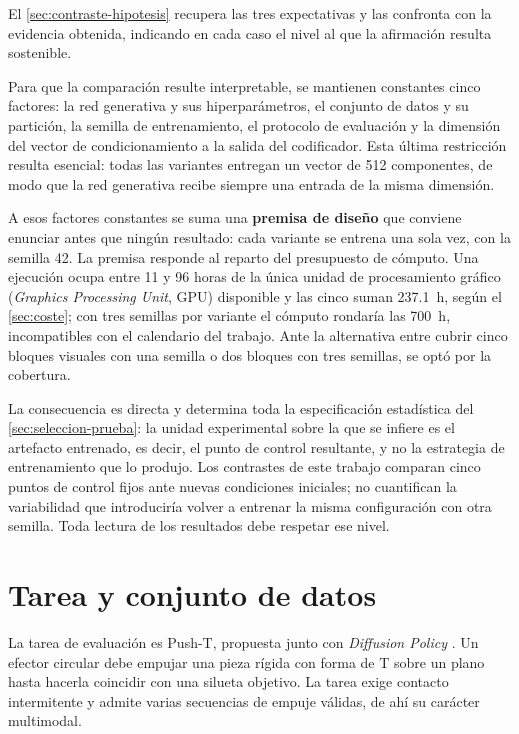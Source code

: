 El \cref{sec:contraste-hipotesis} recupera las tres expectativas y las confronta con la
evidencia obtenida, indicando en cada caso el nivel al que la afirmaci\'on resulta
sostenible.

Para que la comparaci\'on resulte interpretable, se mantienen constantes cinco factores: la
red generativa y sus hiperpar\'ametros, el conjunto de datos y su partici\'on, la semilla de
entrenamiento, el protocolo de evaluaci\'on y la dimensi\'on del vector de condicionamiento
a la salida del codificador.
Esta \'ultima restricci\'on resulta esencial: todas las variantes entregan un vector de
\num{512} componentes, de modo que la red generativa recibe siempre una entrada de la misma
dimensi\'on.

A esos factores constantes se suma una \textbf{premisa de dise\~no} que conviene enunciar
antes que ning\'un resultado: cada variante se entrena una sola vez, con la semilla
\num{42}. La premisa responde al reparto del presupuesto de c\'omputo. Una ejecuci\'on
ocupa entre \num{11} y \num{96} horas de la \'unica unidad de procesamiento gr\'afico
(\textit{Graphics Processing Unit}, GPU) disponible y las cinco suman \SI{237.1}{\hour},
seg\'un el \cref{sec:coste}; con tres semillas por variante el c\'omputo rondar\'ia las
\SI{700}{\hour}, incompatibles con el calendario del trabajo. Ante la alternativa entre
cubrir cinco bloques visuales con una semilla o dos bloques con tres semillas, se opt\'o
por la cobertura.

La consecuencia es directa y determina toda la especificaci\'on estad\'istica del
\cref{sec:seleccion-prueba}: la unidad experimental sobre la que se infiere es el
artefacto entrenado, es decir, el punto de control resultante, y no la estrategia de
entrenamiento que lo produjo. Los contrastes de este trabajo comparan cinco puntos de
control fijos ante nuevas condiciones iniciales; no cuantifican la variabilidad que
introducir\'ia volver a entrenar la misma configuraci\'on con otra semilla. Toda lectura
de los resultados debe respetar ese nivel.

\section{Tarea y conjunto de datos}
\label{sec:datos}

La tarea de evaluaci\'on es Push-T, propuesta junto con \textit{Diffusion Policy}
\cite{chi2025diffusion}. Un efector circular debe empujar una pieza r\'igida con forma de T
sobre un plano hasta hacerla coincidir con una silueta objetivo. La tarea exige contacto
intermitente y admite varias secuencias de empuje v\'alidas, de ah\'i su car\'acter
multimodal.

